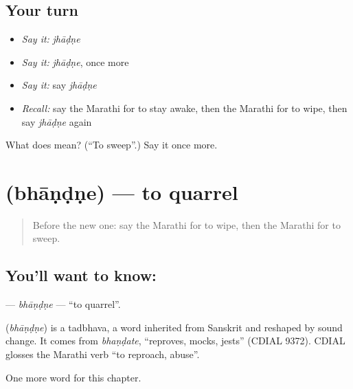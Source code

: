 \subsection*{Your turn}
\begin{itemize}
\raggedright
  \item \emph{Say it:} \emph{jhāḍṇe}
  \item \emph{Say it:} \emph{jhāḍṇe}, once more
  \item \emph{Say it:} say \emph{jhāḍṇe}
  \item \emph{Recall:} say the Marathi for to stay awake, then the Marathi for to wipe, then say \emph{jhāḍṇe} again
\end{itemize}

\begin{tcolorbox}[breakable,colback=teal!4,colframe=teal!35!black,title={Before you move on}]
What does  mean? (\textquotedblleft{}To sweep\textquotedblright{}.) Say it once more.
\end{tcolorbox}
\section[\texorpdfstring{\mr{भांडणे} (bhāṇḍṇe)}{भांडणे (bhāṇḍṇe)}]{ (bhāṇḍṇe) — to quarrel}

\label{lesson:MR-C158-bhandne}



\begin{quote}
Before the new one: say the Marathi for to wipe, then the Marathi for to sweep.
\end{quote}

\subsection*{You'll want to know: }
\textbf{} — \emph{bhāṇḍṇe} — \textquotedblleft{}to quarrel\textquotedblright{}.

\begin{cousinweb}
\textbf{} (\emph{bhāṇḍṇe}) is a tadbhava, a word inherited from Sanskrit and reshaped by sound change. It comes from \emph{bhaṇḍate}, \textquotedblleft{}reproves, mocks, jests\textquotedblright{} (CDIAL 9372). CDIAL glosses the Marathi verb \textquotedblleft{}to reproach, abuse\textquotedblright{}.
\end{cousinweb}

\begin{grammarlens}[title={What you've built}]
One more word for this chapter.
\end{grammarlens}

